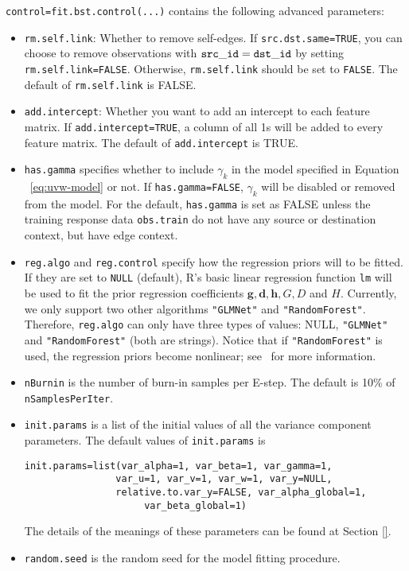  {\tt control=fit.bst.control(...)} contains the following advanced parameters:
\begin{itemize}
\item {\tt rm.self.link}: Whether to remove self-edges.  If {\tt src.dst.same=TRUE}, you can choose to remove observations with ${\tt src\_id} = {\tt dst\_id}$ by setting {\tt rm.self.link=FALSE}.  Otherwise, {\tt rm.self.link} should be set to {\tt FALSE}. The default of {\tt rm.self.link} is FALSE.
\item {\tt add.intercept}: Whether you want to add an intercept to each feature matrix.  If {\tt add.intercept=TRUE}, a column of all 1s will be added to every feature matrix. The default of {\tt add.intercept} is TRUE.
\item {\tt has.gamma} specifies whether to include $\gamma_k$ in the model specified in Equation ~\ref{eq:uvw-model} or not.  If {\tt has.gamma=FALSE}, $\gamma_k$ will be disabled or removed from the model. For the default, {\tt has.gamma} is set as FALSE unless the training response data {\tt obs.train} do not have any source or destination context, but have edge context.
\item {\tt reg.algo} and {\tt reg.control} specify how the regression priors will to be fitted.  If they are set to {\tt NULL} (default), R's basic linear regression function {\tt lm} will be used to fit the prior regression coefficients $\bm{g}, \bm{d}, \bm{h}, G, D$ and $H$.  Currently, we only support two other algorithms {\tt "GLMNet"} and {\tt "RandomForest"}. Therefore, {\tt reg.algo} can only have three types of values: NULL, {\tt "GLMNet"} and {\tt "RandomForest"} (both are strings). Notice that if {\tt "RandomForest"} is used, the regression priors become nonlinear; see~\cite{gmf:recsys11} for more information.
\item {\tt nBurnin} is the number of burn-in samples per E-step. The default is 10\% of {\tt nSamplesPerIter}.
\item {\tt init.params} is a list of the initial values of all the variance component parameters. The default values of {\tt init.params} is
{\small\begin{verbatim}
init.params=list(var_alpha=1, var_beta=1, var_gamma=1,
                var_u=1, var_v=1, var_w=1, var_y=NULL,
                relative.to.var_y=FALSE, var_alpha_global=1, 
					 var_beta_global=1)
\end{verbatim}}
The details of the meanings of these parameters can be found at Section \ref{}.
\item {\tt random.seed} is the random seed for the model fitting procedure.
\end{itemize}
